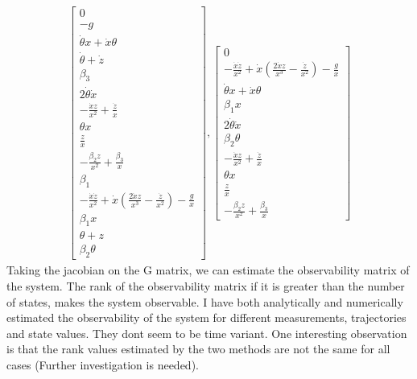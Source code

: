 \documentclass[12pt]{article}
\begin{document}
\begin{align*}
    \left[\begin{matrix}0\\- g\\\dot{\theta} x + \dot{x} \theta\\\dot{\theta} + \dot{z}\\\beta_{3}\\2 \dot{\theta} \dot{x}\\- \frac{\dot{x} z}{x^{2}} + \frac{\dot{z}}{x}\\\theta x\\\frac{z}{x}\\- \frac{\beta_{2} z}{x^{2}} + \frac{\beta_{3}}{x}\\\beta_{1}\\- \frac{\dot{x} \dot{z}}{x^{2}} + \dot{x} \left(\frac{2 \dot{x} z}{x^{3}} - \frac{\dot{z}}{x^{2}}\right) - \frac{g}{x}\\\beta_{1} x\\\theta + z\\\beta_{2} \theta\end{matrix}\right],
    \left[\begin{matrix}0\\- \frac{\dot{x} \dot{z}}{x^{2}} + \dot{x} \left(\frac{2 \dot{x} z}{x^{3}} - \frac{\dot{z}}{x^{2}}\right) - \frac{g}{x}\\\dot{\theta} x + \dot{x} \theta\\\beta_{1} x\\2 \dot{\theta} \dot{x}\\\beta_{2} \theta\\- \frac{\dot{x} z}{x^{2}} + \frac{\dot{z}}{x}\\\theta x\\\frac{z}{x}\\- \frac{\beta_{2} z}{x^{2}} + \frac{\beta_{3}}{x}\end{matrix}\right]
\end{align*}
Taking the jacobian on the G matrix, we can estimate the observability matrix of the system. The rank of the observability matrix if it is greater than the number of states, makes the system observable.
I have both analytically and numerically estimated the observability of the system for different measurements, trajectories and state values. They dont seem to be time variant. One interesting observation is that the rank values estimated by the two methods are not the same for all cases (Further investigation is needed).
\end{document}
